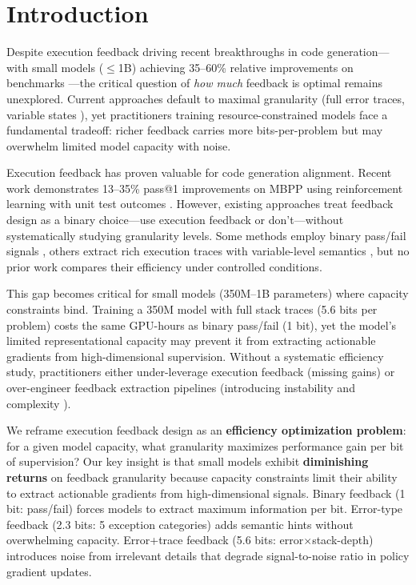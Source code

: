 \section{Introduction}

Despite execution feedback driving recent breakthroughs in code generation---with small models ($\leq$1B) achieving 35--60\% relative improvements on benchmarks \cite{cho2025cocos,skopin2026rlvr}---the critical question of \emph{how much} feedback is optimal remains unexplored. Current approaches default to maximal granularity (full error traces, variable states \cite{jiang2025coderl}), yet practitioners training resource-constrained models face a fundamental tradeoff: richer feedback carries more bits-per-problem but may overwhelm limited model capacity with noise.

Execution feedback has proven valuable for code generation alignment. Recent work demonstrates 13--35\% pass@1 improvements on MBPP using reinforcement learning with unit test outcomes \cite{skopin2026rlvr,cho2025cocos}. However, existing approaches treat feedback design as a binary choice---use execution feedback or don't---without systematically studying granularity levels. Some methods employ binary pass/fail signals \cite{skopin2026rlvr}, others extract rich execution traces with variable-level semantics \cite{jiang2025coderl}, but no prior work compares their efficiency under controlled conditions.

This gap becomes critical for small models (350M--1B parameters) where capacity constraints bind. Training a 350M model with full stack traces (5.6 bits per problem) costs the same GPU-hours as binary pass/fail (1 bit), yet the model's limited representational capacity may prevent it from extracting actionable gradients from high-dimensional supervision. Without a systematic efficiency study, practitioners either under-leverage execution feedback (missing gains) or over-engineer feedback extraction pipelines (introducing instability and complexity \cite{mcandrews2026feedback}).

We reframe execution feedback design as an \textbf{efficiency optimization problem}: for a given model capacity, what granularity maximizes performance gain per bit of supervision? Our key insight is that small models exhibit \textbf{diminishing returns} on feedback granularity because capacity constraints limit their ability to extract actionable gradients from high-dimensional signals. Binary feedback (1 bit: pass/fail) forces models to extract maximum information per bit. Error-type feedback (2.3 bits: 5 exception categories) adds semantic hints without overwhelming capacity. Error+trace feedback (5.6 bits: error$\times$stack-depth) introduces noise from irrelevant details that degrade signal-to-noise ratio in policy gradient updates.

